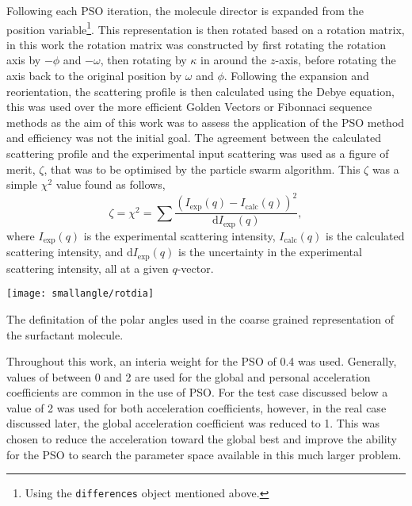 Following each PSO iteration, the molecule director is expanded from the position variable\footnote{Using the \texttt{differences} object mentioned above.}.
This representation is then rotated based on a rotation matrix, in this work the rotation matrix was constructed by first rotating the rotation axis by $-\phi$ and $-\omega$, then rotating by $\kappa$ in around the $z$-axis, before rotating the axis back to the original position by $\omega$ and $\phi$.\autocite[Figure~\ref{fig:rot} defines these angles]{evans_rotations_2001}
Following the expansion and reorientation, the scattering profile is then calculated using the Debye equation,\autocite{debye_zerstreuung_1915} this was used over the more efficient Golden Vectors\autocite{watson_rapid_2013} or Fibonnaci sequence\autocite{svergun_solution_1994} methods as the aim of this work was to assess the application of the PSO method and efficiency was not the initial goal.
The agreement between the calculated scattering profile and the experimental input scattering was used as a figure of merit, $\zeta$, that was to be optimised by the particle swarm algorithm.
This $\zeta$ was a simple $\chi^2$ value found as follows,
%
\begin{equation}
\zeta = \chi^2 = \sum\frac{(I_{\text{exp}}(q) - I_{\text{calc}}(q))^2}{\text{d}I_{\text{exp}}(q)},
\end{equation}
%
where $I_{\text{exp}}(q)$ is the experimental scattering intensity, $I_{\text{calc}}(q)$ is the calculated scattering intensity, and $\text{d}I_{\text{exp}}(q)$ is the uncertainty in the experimental scattering intensity, all at a given $q$-vector.
%
\begin{marginfigure}
    \centering
\texttt{[image: smallangle/rotdia]}
    \caption{The definitation of the polar angles used in the coarse grained representation of the surfactant molecule.}
    \label{fig:rot}
\end{marginfigure}
%

Throughout this work, an interia weight for the PSO of 0.4 was used.
Generally, values of between 0 and 2 are used for the global and personal acceleration coefficients are common in the use of PSO.
For the test case discussed below a value of 2 was used for both acceleration coefficients, however, in the real case discussed later, the global acceleration coefficient was reduced to 1.
This was chosen to reduce the acceleration toward the global best and improve the ability for the PSO to search the parameter space available in this much larger problem.

